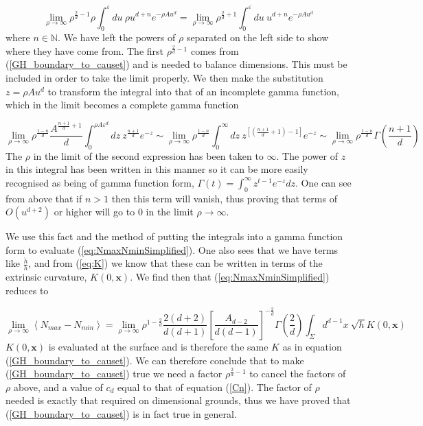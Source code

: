 \documentclass[12pt]{article}
\newcommand{\be}{\begin{equation}}
\newcommand{\ee}{\end{equation}}
\begin{document}
\be\label{eq:VanishingOrderIntegral}
\lim_{\rho \to \infty}\rho^{\frac{2}{d}-1}\rho\int_{0}^{\varepsilon}du\
\rho u^{d+n}e^{-\rho Au^{d}}=\lim_{\rho \to \infty}\rho^{\frac{2}{d}+1}\int_{0}^{\varepsilon}du\
u^{d+n}e^{-\rho Au^{d}}
\ee
where $n\in\mathbb{N}$. We have left the powers of $\rho$ separated on the left side to show where they have come from. The first $\rho^{\frac{2}{d}-1}$ comes from (\ref{GH_boundary_to_causet}) and is needed to balance dimensions. This must be included in order to take the limit properly. We then make the substitution $z=\rho Au^{d}$ to transform the integral into that of an incomplete gamma function, which in the limit becomes a complete gamma function

\be\label{eq:GammaVanishingOrderIntegral}
\lim_{\rho \to \infty}\rho^{\frac{1-n}{d}}\frac{A^{\frac{n+1}{d}+1}}{d}\int_{0}^{\rho A\varepsilon^d}dz\
z^{\frac{n+1}{d}}e^{-z}\sim\lim_{\rho \to \infty}\rho^{\frac{1-n}{d}}\int_{0}^{\infty}dz\
z^{\left[\left(\frac{n+1}{d}+1\right)-1 \right]}e^{-z}\sim\lim_{\rho \to \infty}\rho^{\frac{1-n}{d}}\Gamma\left(\frac{n+1}{d}\right)
\ee
The $\rho$ in the limit of the second expression has been taken to $\infty$. The power of $z$ in this integral has been written in this manner so it can be more easily recognised as being of gamma function form, $\Gamma(t)=\int_{0}^{\infty}z^{t-1}e^{-z}dz$. One can see from above that if $n>1$ then this term will vanish, thus proving that terms of $O(u^{d+2})$ or higher will go to $0$ in the limit $\rho\rightarrow\infty$.

We use this fact and the method of putting the integrals into a gamma function form to evaluate (\ref{eq:NmaxNminSimplified}). One also sees that we have terms like $\frac{\dot{h}}{h}$, and from (\ref{eq:K}) we know that these can be written in terms of the extrinsic curvature, $K(0,\mathbf{x})$. We find then that (\ref{eq:NmaxNminSimplified}) reduces to

\be\label{eq:nmax_eq:nmin_end}
\lim_{\rho \to \infty}\left\langle N_{max}-N_{min} \right\rangle=\lim_{\rho \to \infty}
\rho^{1-\frac{2}{d}}\frac{2(d+2)}{d(d+1)}
\left[\frac{A_{d-2}}{d(d-1)}\right]^{-\frac{2}{d}}
\Gamma\left(\frac{2}{d}\right)\int_{\Sigma}d^{d-1}x\
\sqrt{h}K(0,\mathbf{x})
\ee
$K(0,\mathbf{x})$ is evaluated at the surface and is therefore the same $K$ as in equation (\ref{GH_boundary_to_causet}). We can therefore conclude that to make (\ref{GH_boundary_to_causet}) true we need a factor $\rho^{\frac{2}{d}-1}$ to cancel the factors of $\rho$ above, and a value of $c_d$ equal to that of equation (\ref{Cn}). The factor of $\rho$ needed is exactly that required on dimensional grounds, thus we have proved that (\ref{GH_boundary_to_causet}) is in fact true in general.
\end{document}
